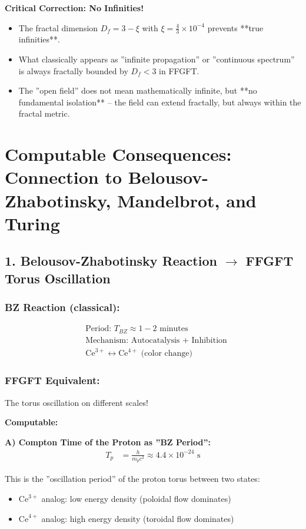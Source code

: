 \documentclass[12pt,a4paper]{article}
\begin{document}
	\textbf{Critical Correction: No Infinities!}
	\begin{itemize}[label=$\bullet$]
		\item The fractal dimension $D_f = 3 - \xi$ with $\xi = \frac{4}{3} \times 10^{-4}$ prevents **true infinities**.
		\item What classically appears as ''infinite propagation'' or ''continuous spectrum'' is always fractally bounded by $D_f < 3$ in FFGFT.
		\item The ''open field'' does not mean mathematically infinite, but **no fundamental isolation** – the field can extend fractally, but always within the fractal metric.
	\end{itemize}
	
	\section*{Computable Consequences: Connection to Belousov-Zhabotinsky, Mandelbrot, and Turing}
	
	\subsection*{1. Belousov-Zhabotinsky Reaction $\rightarrow$ FFGFT Torus Oscillation}
	
	\subsubsection*{BZ Reaction (classical):}
	\begin{align*}
		&\text{Period: } T_{BZ} \approx 1-2 \text{ minutes} \\
		&\text{Mechanism: Autocatalysis + Inhibition} \\
		&\text{Ce}^{3+} \longleftrightarrow \text{Ce}^{4+} \text{ (color change)}
	\end{align*}
	
	\subsubsection*{FFGFT Equivalent:}
	The torus oscillation on different scales!
	
	\textbf{Computable:}
	
	\textbf{A) Compton Time of the Proton as ''BZ Period'':}
	\begin{align*}
		T_p &= \frac{h}{m_p c^2} \approx 4.4 \times 10^{-24} \text{ s}
	\end{align*}
	
	This is the ''oscillation period'' of the proton torus between two states:
	\begin{itemize}
		\item $\text{Ce}^{3+}$ analog: low energy density (poloidal flow dominates)
		\item $\text{Ce}^{4+}$ analog: high energy density (toroidal flow dominates)
	\end{itemize}
	
\end{document}
